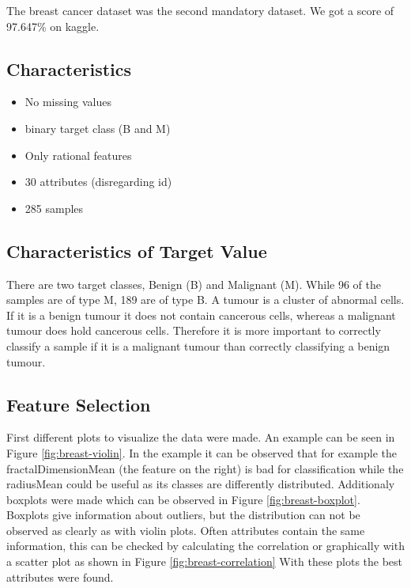 The breast cancer dataset was the second mandatory dataset. We got a score of 97.647\% on kaggle. 

\subsection{Characteristics}

\begin{itemize}
\item No missing values
\item binary target class (B and M)
\item Only rational features
\item 30 attributes (disregarding id)
\item 285 samples
\end{itemize}

\subsection{Characteristics of Target Value}

There are two target classes, Benign (B) and Malignant (M).
While 96 of the samples are of type M, 189 are of type B.
A tumour is a cluster of abnormal cells. If it is a benign tumour it does not contain cancerous cells, whereas a malignant tumour does hold cancerous cells.
Therefore it is more important to correctly classify a sample if it is a malignant tumour than correctly classifying a benign tumour.



\subsection{Feature Selection}
First different plots to visualize the data were made. An example can be seen in Figure \ref{fig:breast-violin}.
In the example it can be observed that for example the fractalDimensionMean (the feature on the right) is bad for classification while the radiusMean could be useful as its classes are differently distributed.
Additionaly boxplots were made which can be observed in Figure \ref{fig:breast-boxplot}.
Boxplots give information about outliers, but the distribution can not be observed as clearly as with violin plots.
Often attributes contain the same information, this can be checked by calculating the correlation or graphically with a scatter plot as shown in Figure \ref{fig:breast-correlation}
With these plots the best attributes were found.

